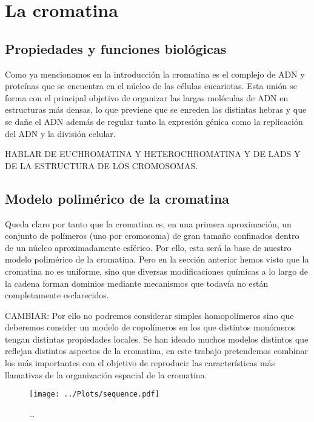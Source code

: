\chapter{La cromatina}
\label{cap:chromatin}

\section{Propiedades y funciones biológicas}

Como ya mencionamos en la introducción la cromatina es el complejo de ADN y proteínas que se encuentra en el núcleo de las células eucariotas. Esta unión se forma con el principal objetivo de organizar las largas moléculas de ADN en estructuras más densas, lo que previene que se enreden las distintas hebras y que se dañe el ADN además de regular tanto la expresión génica como la replicación del ADN y la división celular.

HABLAR DE EUCHROMATINA Y HETEROCHROMATINA Y DE LADS Y DE LA ESTRUCTURA DE LOS CROMOSOMAS.

\section{Modelo polimérico de la cromatina}

Queda claro por tanto que la cromatina es, en una primera aproximación, un conjunto de polímeros (uno por cromosoma) de gran tamaño confinados dentro de un núcleo aproximadamente esférico. Por ello, esta será la base de nuestro modelo polimérico de la cromatina. Pero en la sección anterior hemos visto que la cromatina no es uniforme, sino que diversas modificaciones químicas a lo largo de la cadena forman dominios mediante mecanismos que todavía no están completamente esclarecidos.

CAMBIAR: Por ello no podremos considerar simples homopolímeros sino que deberemos consider un modelo de copolímeros en los que distintos monómeros tengan distintas propiedades locales. Se han ideado muchos modelos distintos que reflejan distintos aspectos de la cromatina, en este trabajo pretendemos combinar los más importantes con el objetivo de reproducir las características más llamativas de la organización espacial de la cromatina.

\begin{figure}
    \centering
    \texttt{[image: ../Plots/sequence.pdf]}
    \caption{\dots}
    \label{fig:sequence}
\end{figure}

